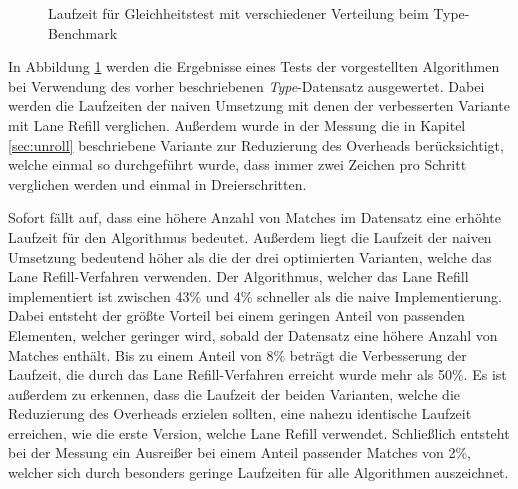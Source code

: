 \begin{figure}[ht]
	\centering
	\caption{Laufzeit für Gleichheitstest mit verschiedener Verteilung beim Type-Benchmark}
	\label{fig:type_equals}
\end{figure}

In Abbildung \ref{fig:type_equals} werden die Ergebnisse eines Tests der vorgestellten Algorithmen bei Verwendung des vorher beschriebenen \emph{Type}-Datensatz ausgewertet.
Dabei werden die Laufzeiten der naiven Umsetzung mit denen der verbesserten Variante mit Lane Refill verglichen.
Außerdem wurde in der Messung die in Kapitel \ref{sec:unroll} beschriebene Variante zur Reduzierung des Overheads berücksichtigt, welche einmal so durchgeführt wurde, dass immer zwei Zeichen pro Schritt verglichen werden und einmal in Dreierschritten.

Sofort fällt auf, dass eine höhere Anzahl von Matches im Datensatz eine erhöhte Laufzeit für den Algorithmus bedeutet.
Außerdem liegt die Laufzeit der naiven Umsetzung bedeutend höher als die der drei optimierten Varianten, welche das Lane Refill-Verfahren verwenden.
Der Algorithmus, welcher das Lane Refill implementiert ist zwischen 43\% und 4\% schneller als die naive Implementierung.
Dabei entsteht der größte Vorteil bei einem geringen Anteil von passenden Elementen, welcher geringer wird, sobald der Datensatz eine höhere Anzahl von Matches enthält.
Bis zu einem Anteil von 8\% beträgt die Verbesserung der Laufzeit, die durch das Lane Refill-Verfahren erreicht wurde mehr als 50\%.
Es ist außerdem zu erkennen, dass die Laufzeit der beiden Varianten, welche die Reduzierung des Overheads erzielen sollten, eine nahezu identische Laufzeit erreichen, wie die erste Version, welche Lane Refill verwendet.
Schließlich entsteht bei der Messung ein Ausreißer bei einem Anteil passender Matches von 2\%, welcher sich durch besonders geringe Laufzeiten für alle Algorithmen auszeichnet.


